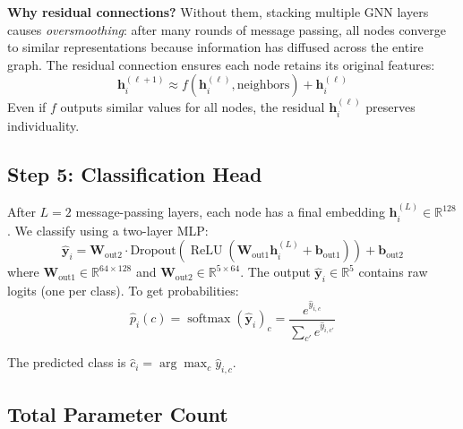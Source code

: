 \documentclass[conference]{IEEEtran}
\newcommand{\R}{\mathbb{R}}
\newcommand{\vect}[1]{\bm{#1}}
\newcommand{\mat}[1]{\mathbf{#1}}
\DeclareMathOperator{\softmax}{softmax}
\DeclareMathOperator{\ReLU}{ReLU}
\begin{document}
\textbf{Why residual connections?} Without them, stacking multiple GNN layers causes \emph{oversmoothing}: after many rounds of message passing, all nodes converge to similar representations because information has diffused across the entire graph. The residual connection ensures each node retains its original features:
\begin{equation}
    \vect{h}_i^{(\ell+1)} \approx f(\vect{h}_i^{(\ell)}, \text{neighbors}) + \vect{h}_i^{(\ell)}
\end{equation}
Even if $f$ outputs similar values for all nodes, the residual $\vect{h}_i^{(\ell)}$ preserves individuality.

\subsection{Step 5: Classification Head}

After $L = 2$ message-passing layers, each node has a final embedding $\vect{h}_i^{(L)} \in \R^{128}$. We classify using a two-layer MLP:
\begin{equation}
    \hat{\vect{y}}_i = \mat{W}_{\text{out2}} \cdot \text{Dropout}\!\left(\ReLU\!\left(\mat{W}_{\text{out1}} \vect{h}_i^{(L)} + \vect{b}_{\text{out1}}\right)\right) + \vect{b}_{\text{out2}}
\end{equation}
where $\mat{W}_{\text{out1}} \in \R^{64 \times 128}$ and $\mat{W}_{\text{out2}} \in \R^{5 \times 64}$. The output $\hat{\vect{y}}_i \in \R^5$ contains raw logits (one per class). To get probabilities:
\begin{equation}
    \hat{p}_i(c) = \softmax(\hat{\vect{y}}_i)_c = \frac{e^{\hat{y}_{i,c}}}{\sum_{c'} e^{\hat{y}_{i,c'}}}
\end{equation}

The predicted class is $\hat{c}_i = \arg\max_c \hat{y}_{i,c}$.

\subsection{Total Parameter Count}
\end{document}
